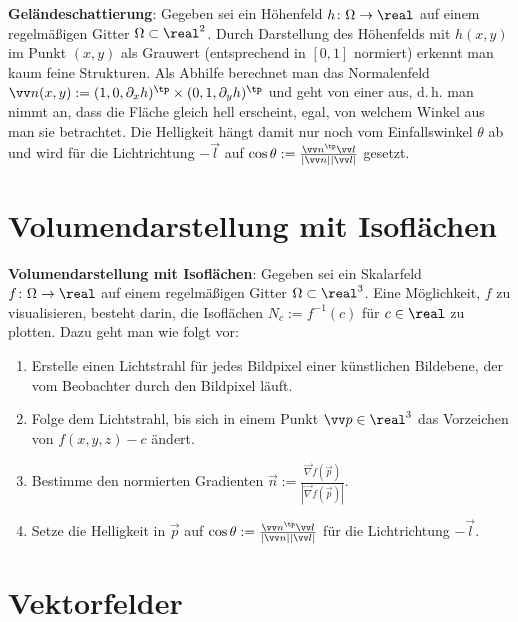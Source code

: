 \textbf{Geländeschattierung}:
Gegeben sei ein Höhenfeld $h\colon \Omega \to \real$ auf einem regelmäßigen Gitter
$\Omega \subset \real^2$.
Durch Darstellung des Höhenfelds mit $h(x, y)$ im Punkt $(x, y)$ als Grauwert
(entsprechend in $[0, 1]$ normiert) erkennt man kaum feine Strukturen.
Als Abhilfe berechnet man das Normalenfeld
$\vec{n}(x, y) := (1, 0, \partial_x h)^\tp \times (0, 1, \partial_y h)^\tp$
und geht von einer  aus,
d.\,h. man nimmt an, dass die Fläche gleich hell erscheint, egal, von welchem Winkel aus
man sie betrachtet.
Die Helligkeit hängt damit nur noch vom Einfallswinkel $\theta$ ab
und wird für die Lichtrichtung $-\vec{l}$ auf
$\cos\theta := \frac{\vec{n}^\tp \vec{l}}{|\vec{n}| |\vec{l}|}$ gesetzt.

\section{%
    Volumendarstellung mit Isoflächen%
}

\textbf{Volumendarstellung mit Isoflächen}:
Gegeben sei ein Skalarfeld $f\colon \Omega \to \real$ auf einem regelmäßigen Gitter
$\Omega \subset \real^3$.
Eine Möglichkeit, $f$ zu visualisieren, besteht darin,
die Isoflächen $N_c := f^{-1}(c)$ für $c \in \real$ zu plotten.
Dazu geht man wie folgt vor:
\begin{enumerate}
    \item
    Erstelle einen Lichtstrahl für jedes Bildpixel einer künstlichen Bildebene,
    der vom Beobachter durch den Bildpixel läuft.

    \item
    Folge dem Lichtstrahl, bis sich in einem Punkt $\vec{p} \in \real^3$
    das Vorzeichen von $f(x, y, z) - c$ ändert.

    \item
    Bestimme den normierten Gradienten
    $\vec{n} := \frac{\vec{\nabla} f(\vec{p})}{|\vec{\nabla} f(\vec{p})|}$.

    \item
    Setze die Helligkeit in $\vec{p}$
    auf $\cos \theta := \frac{\vec{n}^\tp \vec{l}}{|\vec{n}| |\vec{l}|}$
    für die Lichtrichtung $-\vec{l}$.
\end{enumerate}

\pagebreak

\section{%
    Vektorfelder%
}

